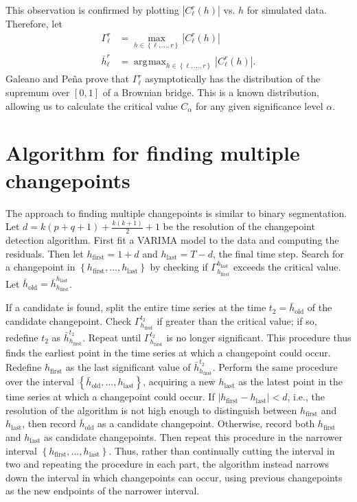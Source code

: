 \documentclass[12pt]{article}
\newcommand\set[1]{\left\{ #1 \right\}}
\newcommand\abs[1]{\left| #1 \right|}
\newcommand\hfirst{{h_{\mathrm{first}}}}
\newcommand\hlast{{h_{\mathrm{last}}}}
\DeclareMathOperator*{\argmax}{\arg\!max}
\begin{document}
This observation is confirmed by plotting $\abs{C_\ell^r(h)}$ vs. $h$ for simulated data. Therefore, let
\begin{align*}
\Gamma_\ell^r&=\max_{h\in\set{\ell,\ldots,r}}|C_\ell^r(h)|\\
\bar h_\ell^r&=\argmax_{h\in\set{\ell,\ldots,r}}|C_\ell^r(h)|.
\end{align*}
Galeano and Pe\~{n}a prove that $\Gamma_\ell^r$ asymptotically has the distribution of the supremum over $[0,1]$ of a Brownian bridge. This is a known distribution, allowing us to calculate the critical value $C_\alpha$ for any given significance level $\alpha$.

\section{Algorithm for finding multiple changepoints}

The approach to finding multiple changepoints is similar to binary segmentation. Let $d=k(p+q+1)+\frac{k(k+1)}{2}+1$ be the resolution of the changepoint detection algorithm. First fit a VARIMA model to the data and computing the residuals. Then let $\hfirst=1+d$ and $\hlast=T-d$, the final time step. Search for a changepoint in $\set{\hfirst,\ldots,\hlast}$ by checking if $\Gamma_\hfirst^\hlast$ exceeds the critical value. Let $\bar h_{\mathrm{old}}=\bar h_\hfirst^\hlast$.

If a candidate is found, split the entire time series at the time $t_2=\bar h_{\mathrm{old}}$ of the candidate changepoint. Check $\Gamma_\hfirst^{t_2}$ if greater than the critical value; if so, redefine $t_2$ as $\bar h_\hfirst^{t_2}$. Repeat until $\Gamma_\hfirst^{t_2}$ is no longer significant. This procedure thus finds the earliest point in the time series at which a changepoint could occur. Redefine $\hfirst$ as the last significant value of $\bar h_\hfirst^{t_2}$. Perform the same procedure over the interval $\set{\bar h_{\mathrm{old}},\ldots,\hlast}$, acquiring a new $\hlast$ as the latest point in the time series at which a changepoint could occur. If $\abs{\hfirst-\hlast}<d$, i.e., the resolution of the algorithm is not high enough to distinguish between $\hfirst$ and $\hlast$, then record $\bar h_{\mathrm{old}}$ as a candidate changepoint. Otherwise, record both $\hfirst$ and $\hlast$ as candidate changepoints. Then repeat this procedure in the narrower interval $\set{\hfirst,\ldots,\hlast}$. Thus, rather than continually cutting the interval in two and repeating the procedure in each part, the algorithm instead narrows down the interval in which changepoints can occur, using previous changepoints as the new endpoints of the narrower interval.
\end{document}
